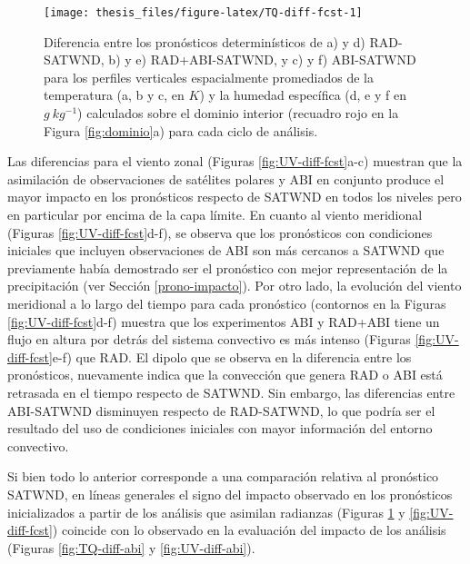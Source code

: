 \documentclass[12pt,oneside,a4paper]{reedthesis}
\begin{document}
\begin{figure}

\texttt{[image: thesis\_files/figure-latex/TQ-diff-fcst-1]} \hfill{}

\caption{Diferencia entre los pronósticos determinísticos de a) y d) RAD-SATWND, b) y e) RAD+ABI-SATWND, y c) y f) ABI-SATWND para los perfiles verticales espacialmente promediados de la temperatura (a, b y c, en \(K\)) y la humedad específica (d, e y f en \(g\ kg^{-1}\)) calculados sobre el dominio interior (recuadro rojo en la Figura \ref{fig:dominio}a) para cada ciclo de análisis.}\label{fig:TQ-diff-fcst}
\end{figure}
Las diferencias para el viento zonal (Figuras \ref{fig:UV-diff-fcst}a-c) muestran que la asimilación de observaciones de satélites polares y ABI en conjunto produce el mayor impacto en los pronósticos respecto de SATWND en todos los niveles pero en particular por encima de la capa límite. En cuanto al viento meridional (Figuras \ref{fig:UV-diff-fcst}d-f), se observa que los pronósticos con condiciones iniciales que incluyen observaciones de ABI son más cercanos a SATWND que previamente había demostrado ser el pronóstico con mejor representación de la precipitación (ver Sección \ref{prono-impacto}). Por otro lado, la evolución del viento meridional a lo largo del tiempo para cada pronóstico (contornos en la Figuras \ref{fig:UV-diff-fcst}d-f) muestra que los experimentos ABI y RAD+ABI tiene un flujo en altura por detrás del sistema convectivo es más intenso (Figuras \ref{fig:UV-diff-fcst}e-f) que RAD. El dipolo que se observa en la diferencia entre los pronósticos, nuevamente indica que la convección que genera RAD o ABI está retrasada en el tiempo respecto de SATWND. Sin embargo, las diferencias entre ABI-SATWND disminuyen respecto de RAD-SATWND, lo que podría ser el resultado del uso de condiciones iniciales con mayor información del entorno convectivo.

Si bien todo lo anterior corresponde a una comparación relativa al pronóstico SATWND, en líneas generales el signo del impacto observado en los pronósticos inicializados a partir de los análisis que asimilan radianzas (Figuras \ref{fig:TQ-diff-fcst} y \ref{fig:UV-diff-fcst}) coincide con lo observado en la evaluación del impacto de los análisis (Figuras \ref{fig:TQ-diff-abi} y \ref{fig:UV-diff-abi}).
\end{document}
